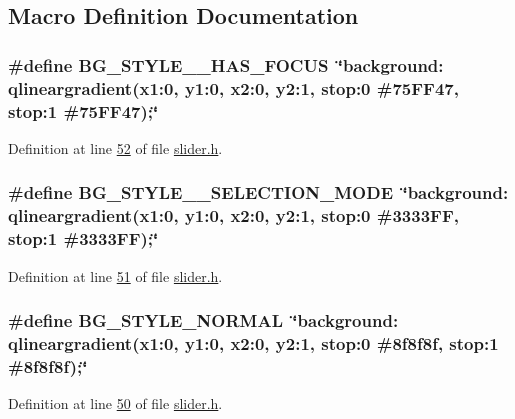 \subsection{Macro Definition Documentation}
\hypertarget{a00025_a3b78c22b908aee9d7cda0ff6240570fd}{
\subsubsection[{B\+G\+\_\+\+S\+T\+Y\+L\+E\+\_\+\+\_\+\+H\+A\+S\+\_\+\+F\+O\+C\+U\+S}]{\setlength{\rightskip}{0pt plus 5cm}\#define B\+G\+\_\+\+S\+T\+Y\+L\+E\+\_\+\+\_\+\+H\+A\+S\+\_\+\+F\+O\+C\+U\+S~\char`\"{}background\+: qlineargradient(x1\+:0, y1\+:0, x2\+:0, y2\+:1, stop\+:0 \#75\+F\+F47, stop\+:1 \#75\+F\+F47);\char`\"{}}}\label{a00025_a3b78c22b908aee9d7cda0ff6240570fd}


Definition at line \hyperlink{a00025_source_l00052}{52} of file \hyperlink{a00025_source}{slider.\+h}.

\hypertarget{a00025_a0d978e946366d0eb299bb966cf8a52e9}{
\subsubsection[{B\+G\+\_\+\+S\+T\+Y\+L\+E\+\_\+\+\_\+\+S\+E\+L\+E\+C\+T\+I\+O\+N\+\_\+\+M\+O\+D\+E}]{\setlength{\rightskip}{0pt plus 5cm}\#define B\+G\+\_\+\+S\+T\+Y\+L\+E\+\_\+\+\_\+\+S\+E\+L\+E\+C\+T\+I\+O\+N\+\_\+\+M\+O\+D\+E~\char`\"{}background\+: qlineargradient(x1\+:0, y1\+:0, x2\+:0, y2\+:1, stop\+:0 \#3333\+F\+F, stop\+:1 \#3333\+F\+F);\char`\"{}}}\label{a00025_a0d978e946366d0eb299bb966cf8a52e9}


Definition at line \hyperlink{a00025_source_l00051}{51} of file \hyperlink{a00025_source}{slider.\+h}.

\hypertarget{a00025_a0a9d6eabafd981a8b48b343249428077}{
\subsubsection[{B\+G\+\_\+\+S\+T\+Y\+L\+E\+\_\+\+N\+O\+R\+M\+A\+L}]{\setlength{\rightskip}{0pt plus 5cm}\#define B\+G\+\_\+\+S\+T\+Y\+L\+E\+\_\+\+N\+O\+R\+M\+A\+L~\char`\"{}background\+: qlineargradient(x1\+:0, y1\+:0, x2\+:0, y2\+:1, stop\+:0 \#8f8f8f, stop\+:1 \#8f8f8f);\char`\"{}}}\label{a00025_a0a9d6eabafd981a8b48b343249428077}


Definition at line \hyperlink{a00025_source_l00050}{50} of file \hyperlink{a00025_source}{slider.\+h}.

